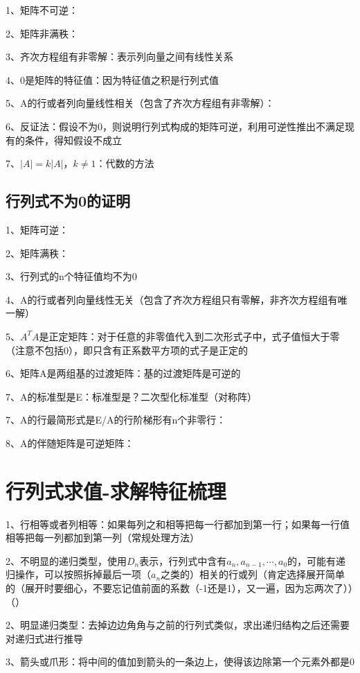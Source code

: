 1、矩阵不可逆：

2、矩阵非满秩：

3、齐次方程组有非零解：表示列向量之间有线性关系

4、0是矩阵的特征值：因为特征值之积是行列式值

5、A的行或者列向量线性相关（包含了齐次方程组有非零解）：

6、反证法：假设不为0，则说明行列式构成的矩阵可逆，利用可逆性推出不满足现有的条件，得知假设不成立

7、$|A|=k|A|$，$k\ne 1$：代数的方法



\subsection{行列式不为0的证明}

1、矩阵可逆：

2、矩阵满秩：

3、行列式的n个特征值均不为0

4、A的行或者列向量线性无关（包含了齐次方程组只有零解，非齐次方程组有唯一解）

5、$A^TA$是正定矩阵：对于任意的非零值代入到二次形式子中，式子值恒大于零（注意不包括0），即只含有正系数平方项的式子是正定的

6、矩阵A是两组基的过渡矩阵：基的过渡矩阵是可逆的

7、A的标准型是E：标准型是？二次型化标准型（对称阵）

7、A的行最简形式是E/A的行阶梯形有n个非零行：

8、A的伴随矩阵是可逆矩阵：

\section{行列式求值-求解特征梳理}

1、行相等或者列相等：如果每列之和相等把每一行都加到第一行；如果每一行值相等把每一列都加到第一列（常规处理方法）

2、不明显的递归类型，使用$D_n$表示，行列式中含有$a_n,a_{n-1},\cdots,a_0$的，可能有递归操作，可以按照拆掉最后一项（$a_n$之类的）相关的行或列（肯定选择展开简单的（展开时要细心，不要忘记值前面的系数（-1还是1），又一遍，因为忘两次了））（）

2、明显递归类型：去掉边边角角与之前的行列式类似，求出递归结构之后还需要对递归式进行推导

3、箭头或爪形：将中间的值加到箭头的一条边上，使得该边除第一个元素外都是0

